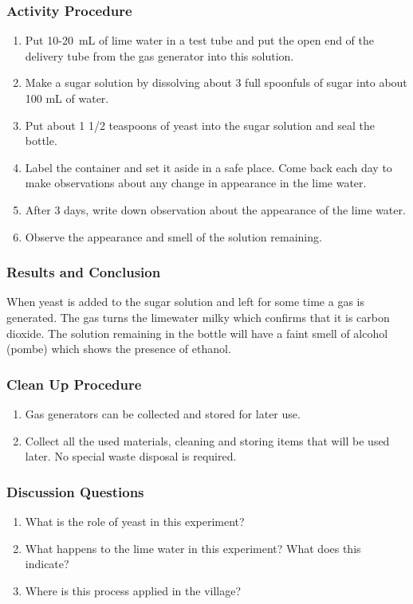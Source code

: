 \subsubsection*{Activity Procedure}
\begin{enumerate}

\item{Put 10-20~mL of lime water in a test tube and put the open end of the delivery tube from the gas generator into this solution.}
\item{Make a sugar solution by dissolving about 3 full spoonfuls of sugar into about 100 mL of water.}
\item{Put about 1 1/2 teaspoons of yeast into the sugar solution and seal the bottle.}
\item{Label the container and set it aside in a safe place. Come back each day to make observations about any change in appearance in the lime water.}
\item{After 3 days, write down observation about the appearance of the lime water.}
\item{Observe the appearance and smell of the solution remaining.}
\end{enumerate}

\subsubsection*{Results and Conclusion}
When yeast is added to the sugar solution and left for some time a gas is generated. The gas turns the limewater milky which confirms that it is carbon dioxide. The solution remaining in the bottle will have a faint smell of alcohol (pombe) which shows the presence of ethanol.

\subsubsection*{Clean Up Procedure}
\begin{enumerate}
\item{Gas generators can be collected and stored for later use.}
\item{Collect all the used materials, cleaning and storing items that will be used later. No special waste disposal is required.}
\end{enumerate}

\subsubsection*{Discussion Questions}
\begin{enumerate}
\item{What is the role of yeast in this experiment?}
\item{What happens to the lime water in this experiment? What does this indicate?}
\item{Where is this process applied in the village?}
\end{enumerate}

